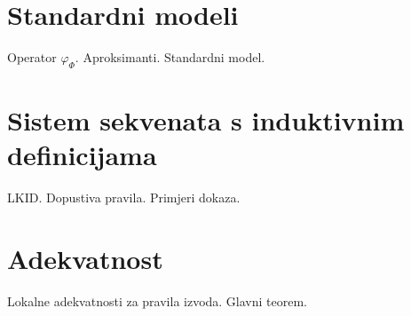 \section{Standardni modeli}\label{sec:standardni-modeli}
Operator \(\varphi_{\Phi}\). Aproksimanti. Standardni model.

\section{Sistem sekvenata s induktivnim definicijama}\label{sec:sistem-sekvenata}
LKID. Dopustiva pravila. Primjeri dokaza.

\section{Adekvatnost}\label{sec:adekvatnost}
Lokalne adekvatnosti za pravila izvoda. Glavni teorem.

